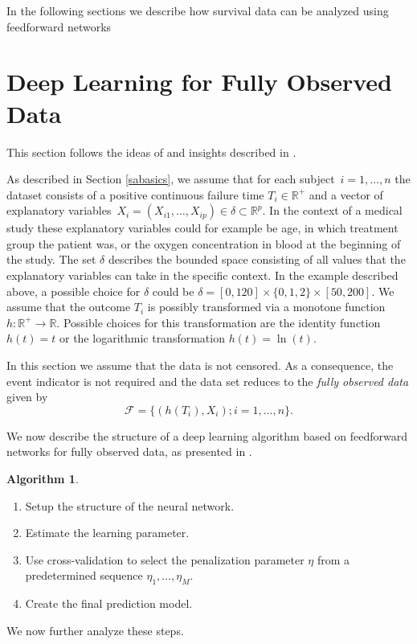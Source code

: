 \documentclass[12pt, a4paper]{scrartcl}
\theoremstyle{definition}
\newtheorem{Algorithm}{Algorithm}[section]
\theoremstyle{plain}
\numberwithin{equation}{section}
\numberwithin{figure}{section}
\numberwithin{table}{section}
\begin{document}
	In the following sections we describe how survival data can be analyzed using feedforward networks
	
	\newpage
	
	\section{Deep Learning for Fully Observed Data} \label{uncensored}
	This section follows the ideas of \citet*{basearticle} and insights described in \citet*{deeplbook}.
	
	As described in Section \ref{sabasics}, we assume that for each subject~$i = 1,\dots,n$ the dataset consists of a positive continuous failure time $T_i \in \mathbb{R}^+$ and a vector of explanatory variables~$X_i = (X_{i1}, \dots , X_{ip}) \in \delta \subset \mathbb{R}^p$.
	In the context of a medical study these explanatory variables could for example be age, in which treatment group the patient was, or the oxygen concentration in blood at the beginning of the study.
	The set $\delta$ describes the bounded space consisting of all values that the explanatory variables can take in the specific context.
	In the example described above, a possible choice for $\delta$ could be $\delta = [0, 120] \times \{0,1,2\} \times [50, 200]$.
	We assume that the outcome $T_i$ is possibly transformed via a monotone function $h: \mathbb{R}^+ \rightarrow \mathbb{R}$.
	Possible choices for this transformation are the identity function $h(t)=t$ or the logarithmic transformation $h(t)= \ln (t)$.
	
	In this section we assume that the data is not censored.
	As a consequence, the event indicator is not required and the data set reduces to the \emph{fully observed data} given by
	\begin{equation*}
	\mathcal{F} =\{ \left( h(T_i), X_i\right); i = 1, \dots, n\}.
	\end{equation*}
	
	We now describe the structure of a deep learning algorithm based on feedforward networks for fully observed data, as presented in \citet*{basearticle}.
	
	\begin{Algorithm}\label{alg:nocensor}
		~
	\begin{enumerate}
		\item Setup the structure of the neural network.
		\item Estimate the learning parameter.
		\item Use cross-validation to select the penalization parameter $\eta$ from a predetermined sequence $\eta_1,\dots,\eta_M$.
		\item Create the final prediction model.
	\end{enumerate}
	\end{Algorithm}
	\noindent We now further analyze these steps.
	
\end{document}
